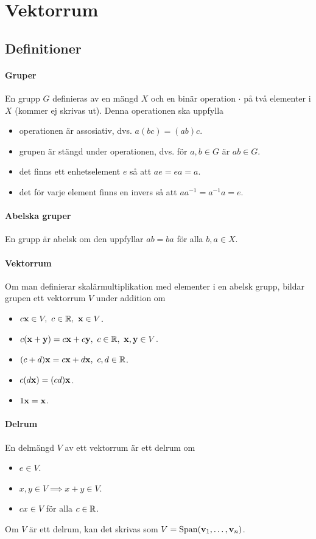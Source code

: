 \section{Vektorrum}

\subsection{Definitioner}

\paragraph{Gruper}
En grupp $G$ definieras av en mängd $X$ och en binär operation $\cdot$ på två elementer i $X$ (kommer ej skrivas ut). Denna operationen ska uppfylla
\begin{itemize}
	\item operationen är assosiativ, dvs. $a(bc) = (ab)c$.
	\item grupen är stängd under operationen, dvs. för $a, b\in G$ är $ab\in G$.
	\item det finns ett enhetselement $e$ så att $ae = ea = a$.
	\item det för varje element finns en invers så att $aa^{-1} = a^{-1}a = e$.
\end{itemize}

\paragraph{Abelska gruper}
En grupp är abelsk om den uppfyllar $ab = ba$ för alla $b, a\in X$.

\paragraph{Vektorrum}
Om man definierar skalärmultiplikation med elementer i en abelsk grupp, bildar grupen ett vektorrum $V$ under addition om
\begin{itemize}
	\item $c\vect{x}\in V,~c\in\R,~\vect{x}\in V$.
	\item $c(\vect{x} + \vect{y}) = c\vect{x} + c\vect{y},~c\in\R,~\vect{x},\vect{y}\in V$.
	\item $(c + d)\vect{x} = c\vect{x} + d\vect{x},~c,d\in\R$.
	\item $c(d\vect{x}) = (cd)\vect{x}$.
	\item $1\vect{x} = \vect{x}$.
\end{itemize}

\paragraph{Delrum}
En delmängd $V$ av ett vektorrum är ett delrum om
\begin{itemize}
	\item $e\in V$.
	\item $x, y\in V\implies x + y\in V$.
	\item $cx\in V$ för alla $c\in\mathbb{R}$.
\end{itemize}
Om $V$ är ett delrum, kan det skrivas som $V = \Span(\vect{v}_1, \dots, \vect{v}_n)$.

